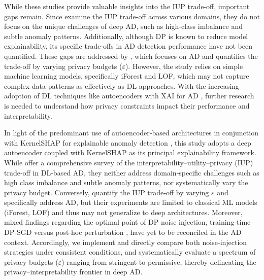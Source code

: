 While these studies provide valuable insights into the IUP trade-off, important gaps remain. Since \cite{saifullah2022privacy} examine the IUP trade-off across various domains, they do not focus on the unique challenges of deep AD, such as high-class imbalance and subtle anomaly patterns. Additionally, although DP is known to reduce model explainability, its specific trade-offs in AD detection performance have not been quantified. These gaps are addressed by \cite{ezzeddine2024differential}, which focuses on AD and quantifies the trade-off by varying privacy budgets ($\varepsilon$). However, the study relies on simple machine learning models, specifically iForest and LOF, which may not capture complex data patterns as effectively as DL approaches. With the increasing adoption of DL techniques like autoencoders with XAI for AD \citep{li2023survey}, further research is needed to understand how privacy constraints impact their performance and interpretability.

In light of the predominant use of autoencoder‐based architectures in conjunction with KernelSHAP for explainable anomaly detection \citep{giurgiu2019additive,chawla2020interpretable,serradilla2021adaptable}, this study adopts a deep autoencoder coupled with KernelSHAP as its principal explainability framework. While \cite{saifullah2022privacy} offer a comprehensive survey of the interpretability–utility–privacy (IUP) trade‑off in DL‑based AD, they neither address domain‑specific challenges such as high class imbalance and subtle anomaly patterns, nor systematically vary the privacy budget. Conversely, \cite{ezzeddine2024differential} quantify the IUP trade‑off by varying $\varepsilon$ and specifically address AD, but their experiments are limited to classical ML models (iForest, LOF) and thus may not generalize to deep architectures. Moreover, mixed findings regarding the optimal point of DP noise injection, training‑time DP‑SGD \citep{wang2018privacy, wu2020value} versus post‑hoc perturbation \citep{zhao2020not,lu2022differentially}, have yet to be reconciled in the AD context. Accordingly, we implement and directly compare both noise‑injection strategies under consistent conditions, and systematically evaluate a spectrum of privacy budgets ($\varepsilon$) ranging from stringent to permissive, thereby delineating the privacy–interpretability frontier in deep AD.